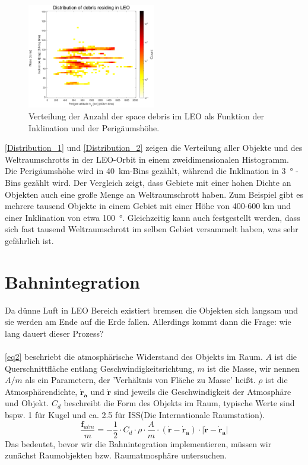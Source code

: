 \documentclass{article}
\begin{document}
\begin{figure}[htbp]
\centering
\includegraphics[width=0.5\textwidth]{bilder/Distribution_2.png}
\caption{Verteilung der Anzahl der space debris im LEO als Funktion der Inklination und der Perigäumshöhe.}
\label{Distribution_2}
\end{figure}
\noindent \autoref{Distribution_1} und \autoref{Distribution_2} zeigen die Verteilung aller Objekte und des Weltraumschrotts in der LEO-Orbit in einem zweidimensionalen Histogramm. Die Perigäumshöhe wird in \SI{40}{\kilo\meter}-Bins gezählt, während die Inklination in \SI{3}{\degree} - Bins gezählt wird. Der Vergleich zeigt, dass Gebiete mit einer hohen Dichte an Objekten auch eine große Menge an Weltraumschrott haben. Zum Beispiel gibt es mehrere tausend Objekte in einem Gebiet mit einer Höhe von 400-600 km und einer Inklination von etwa \SI{100}{\degree}. Gleichzeitig kann auch festgestellt werden, dass sich fast tausend Weltraumschrott im selben Gebiet versammelt haben, was sehr gefährlich ist.


\clearpage	
\section{Bahnintegration}\label{sec:pass}
Da dünne Luft in LEO Bereich existiert bremsen die Objekten sich langsam und sie werden am Ende auf die Erde fallen. Allerdings kommt dann die Frage: wie lang dauert dieser Prozess?
\\\\
\autoref{eq2} beschriebt die atmosphärische Widerstand des Objekts im Raum. $A$ ist die Querschnittfläche entlang Geschwindigkeitsrichtung, $m$ ist die Masse, wir nennen $A/m$ als ein Parametern, der 'Verhältnis von Fläche zu Masse' heißt. $\rho$ ist die Atmosphärendichte, $\bm{\dot{r}_a}$ und $\bm{\dot{r}}$ sind jeweils die Geschwindigkeit der Atmosphäre und Objekt. $C_d$ beschreibt die Form des Objekts im Raum, typische Werte sind bspw. 1 für Kugel und ca. 2.5 für ISS(Die Internationale Raumstation).
\begin{equation}\label{eq2}
	\frac{\bm{f}_{atm}}{m} = -\frac{1}{2} \cdot C_d \cdot \rho \cdot \frac{A}{m} \cdot \left(\bm{\dot{r}} - \bm{\dot{r}_a}\right) \cdot |\bm{\dot{r}} - \bm{\dot{r}_a}|
\end{equation}
Das bedeutet, bevor wir die Bahnintegration implementieren, müssen wir zunächst Raumobjekten bzw. Raumatmosphäre untersuchen.
\end{document}
